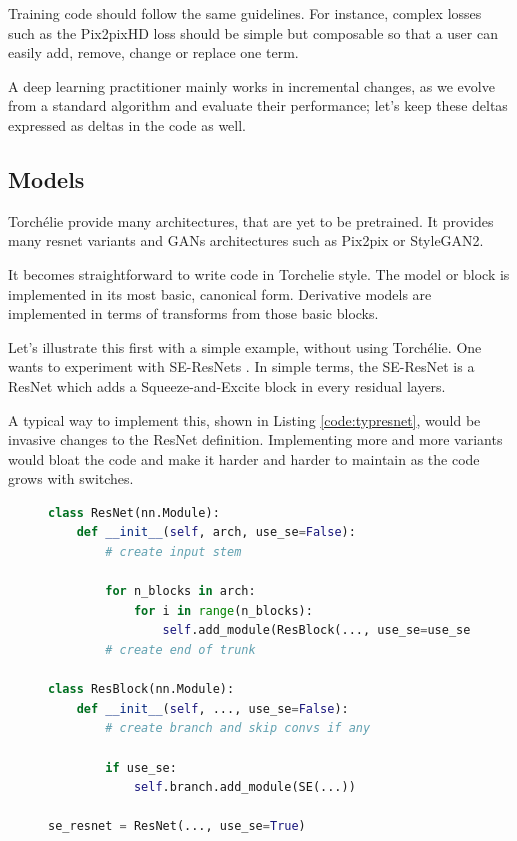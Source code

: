 \begin{enumerate}
    Training code should follow the same guidelines. For instance, complex losses such as the Pix2pixHD loss should be simple but composable so that a user can easily add, remove, change or replace one term.
    
    A deep learning practitioner mainly works in incremental changes, as we evolve from a standard algorithm and evaluate their performance; let's keep these deltas expressed as deltas in the code as well.
\end{enumerate}

\subsection{Models}
\label{sec:tch.models}

Torchélie provide many architectures, that are yet to be pretrained. It provides many resnet variants and GANs architectures such as Pix2pix or StyleGAN2.

It becomes straightforward to write code in Torchelie style. The model or block is implemented in its most basic, canonical form. Derivative models are implemented in terms of transforms from those basic blocks.

Let's illustrate this first with a simple example, without using Torchélie. One wants to experiment with SE-ResNets \cite{squeezeexcitation}. In simple terms, the SE-ResNet is a ResNet which adds a Squeeze-and-Excite block in every residual layers.

A typical way to implement this, shown in Listing \ref{code:typresnet}, would be invasive changes to the ResNet definition. Implementing more and more variants would bloat the code and make it harder and harder to maintain as the code grows with switches.

\begin{figure}
\begin{lstlisting}[language=Python, label=code:typresnet, caption=Typical SE-ResNet implementation. Note how \texttt{use\_se} has to be passed down. Details are left out for clarity and brievity.]
class ResNet(nn.Module):
    def __init__(self, arch, use_se=False):
        # create input stem
        
        for n_blocks in arch:
            for i in range(n_blocks):
                self.add_module(ResBlock(..., use_se=use_se))
        # create end of trunk

class ResBlock(nn.Module):
    def __init__(self, ..., use_se=False):
        # create branch and skip convs if any
        
        if use_se:
            self.branch.add_module(SE(...))
            
se_resnet = ResNet(..., use_se=True)
\end{lstlisting}
\end{figure}

